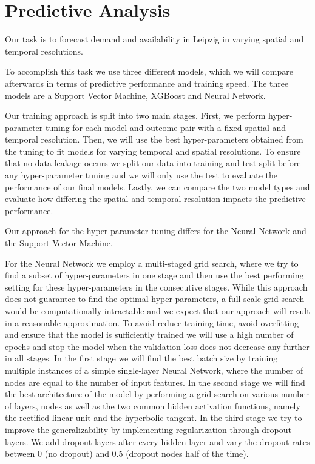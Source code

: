 \clearpage
\section{Predictive Analysis}
\label{sec:predictive_analysis}

Our task is to forecast demand and availability in Leipzig in varying spatial and temporal resolutions.

To accomplish this task we use three different models, which we will compare afterwards in terms of predictive performance and training speed.
The three models are a Support Vector Machine, XGBoost and Neural Network.

Our training approach is split into two main stages.
First, we perform hyper-parameter tuning for each model and outcome pair with a fixed spatial and temporal resolution. Then, we will use the best hyper-parameters obtained from the tuning to fit models for varying temporal and spatial resolutions.
To ensure that no data leakage occurs we split our data into training and test split before any hyper-parameter tuning and we will only use the test to evaluate the performance of our final models.
Lastly, we can compare the two model types and evaluate how differing the spatial and temporal resolution impacts the predictive performance.


Our approach for the hyper-parameter tuning differs for the Neural Network and the Support Vector Machine.

For the Neural Network we employ a multi-staged grid search, where we try to find a subset of hyper-parameters in one stage and then use the best performing setting for these hyper-parameters in the consecutive stages.
While this approach does not guarantee to find the optimal hyper-parameters, a full scale grid search would be computationally intractable and we expect that our approach will result in a reasonable approximation.
To avoid reduce training time, avoid overfitting and ensure that the model is sufficiently trained we will use a high number of epochs and stop the model when the validation loss does not decrease any further in all stages.
In the first stage we will find the best batch size by training multiple instances of a simple single-layer Neural Network, where the number of nodes are equal to the number of input features.
In the second stage we will find the best architecture of the model by performing a grid search on various number of layers, nodes as well as the two common hidden activation functions, namely the rectified linear unit and the hyperbolic tangent.
In the third stage we try to improve the generalizability by implementing regularization through dropout layers.
We add dropout layers after every hidden layer and vary the dropout rates between 0 (no dropout) and 0.5 (dropout nodes half of the time).

